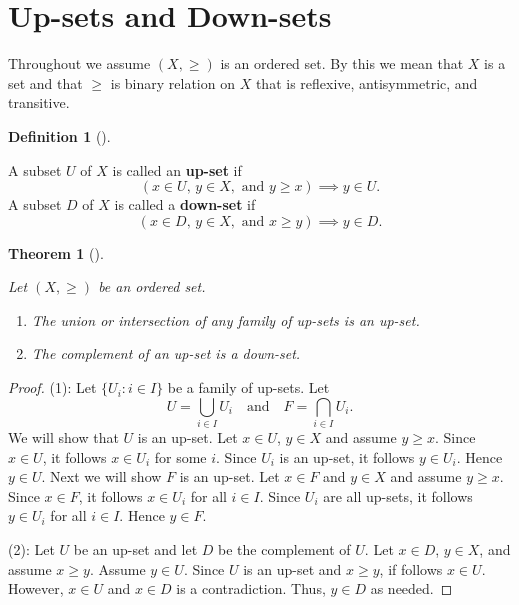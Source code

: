 \documentclass[
  letterpaper,
  10pt,
  reqno,
  twopage,
  openany]{book}
\providecommand{\tightlist}{%
  \setlength{\itemsep}{0pt}\setlength{\parskip}{0pt}}\usepackage{longtable,booktabs,array}
\theoremstyle{plain}
\theoremstyle{definition}
\theoremstyle{definition}
\newtheorem{definition}{Definition}[chapter]
\theoremstyle{definition}
\theoremstyle{plain}
\theoremstyle{plain}
\newtheorem{theorem}{Theorem}[chapter]
\theoremstyle{remark}
\begin{document}
\hypertarget{up-sets-and-down-sets}{%
\section{Up-sets and Down-sets}\label{up-sets-and-down-sets}}

Throughout we assume \((X,\geq)\) is an ordered set. By this we mean
that \(X\) is a set and that \(\geq\) is binary relation on \(X\) that
is reflexive, antisymmetric, and transitive.

\leavevmode{}%
\begin{definition}[]\label{def-up-down}

A subset \(U\) of \(X\) is called an  \textbf{up-set} if
\[(x\in U, \, y\in X, \text{ and } y\geq x) \implies y\in U.\] A subset
\(D\) of \(X\) is called a  \textbf{down-set} if
\[ (x\in D, \, y\in X, \text{ and } x\geq y) \implies y\in D.\]

\end{definition}

\leavevmode{}%
\begin{theorem}[]\label{thm-union-intersection}

Let \((X,\geq)\) be an ordered set.

\begin{enumerate}
\def\labelenumi{\arabic{enumi}.}
\tightlist
\item
  The union or intersection of any family of up-sets is an up-set.
\item
  The complement of an up-set is a down-set.
\end{enumerate}

\end{theorem}

\begin{proof}

(1): Let \(\{U_i : i \in I\}\) be a family of up-sets. Let \[
U=\bigcup_{i\in I} U_i
\quad \text{and} \quad 
F=\bigcap_{i\in I} U_i.
\] We will show that \(U\) is an up-set. Let \(x\in U\), \(y\in X\) and
assume \(y\geq x.\) Since \(x\in U\), it follows \(x\in U_i\) for some
\(i.\) Since \(U_i\) is an up-set, it follows \(y\in U_i.\) Hence
\(y\in U.\) Next we will show \(F\) is an up-set. Let \(x\in F\) and
\(y\in X\) and assume \(y\geq x.\) Since \(x\in F\), it follows
\(x\in U_i\) for all \(i\in I.\) Since \(U_i\) are all up-sets, it
follows \(y \in U_i\) for all \(i\in I.\) Hence \(y\in F.\)

(2): Let \(U\) be an up-set and let \(D\) be the complement of \(U.\)
Let \(x\in D\), \(y\in X\), and assume \(x\geq y.\) Assume \(y\in U.\)
Since \(U\) is an up-set and \(x\geq y\), if follows \(x\in U.\)
However, \(x\in U\) and \(x\in D\) is a contradiction. Thus, \(y\in D\)
as needed.

\end{proof}
\end{document}
